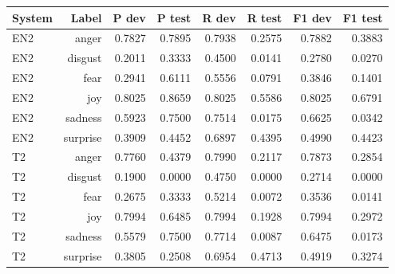 \begin{tabular}{lrrrrrrr}
\toprule
System & Label & P dev & P test & R dev & R test & F1 dev & F1 test \\
\midrule
EN2 & anger & 0.7827 & 0.7895 & 0.7938 & 0.2575 & 0.7882 & 0.3883 \\
EN2 & disgust & 0.2011 & 0.3333 & 0.4500 & 0.0141 & 0.2780 & 0.0270 \\
EN2 & fear & 0.2941 & 0.6111 & 0.5556 & 0.0791 & 0.3846 & 0.1401 \\
EN2 & joy & 0.8025 & 0.8659 & 0.8025 & 0.5586 & 0.8025 & 0.6791 \\
EN2 & sadness & 0.5923 & 0.7500 & 0.7514 & 0.0175 & 0.6625 & 0.0342 \\
EN2 & surprise & 0.3909 & 0.4452 & 0.6897 & 0.4395 & 0.4990 & 0.4423 \\
T2 & anger & 0.7760 & 0.4379 & 0.7990 & 0.2117 & 0.7873 & 0.2854 \\
T2 & disgust & 0.1900 & 0.0000 & 0.4750 & 0.0000 & 0.2714 & 0.0000 \\
T2 & fear & 0.2675 & 0.3333 & 0.5214 & 0.0072 & 0.3536 & 0.0141 \\
T2 & joy & 0.7994 & 0.6485 & 0.7994 & 0.1928 & 0.7994 & 0.2972 \\
T2 & sadness & 0.5579 & 0.7500 & 0.7714 & 0.0087 & 0.6475 & 0.0173 \\
T2 & surprise & 0.3805 & 0.2508 & 0.6954 & 0.4713 & 0.4919 & 0.3274 \\
\bottomrule
\end{tabular}
